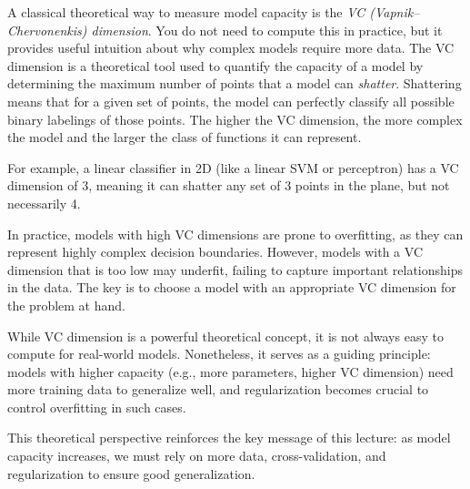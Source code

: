 \documentclass{article}
\begin{document}
A classical theoretical way to measure model capacity is the  \textit{VC (Vapnik–Chervonenkis) dimension}. You do not need to compute this in practice, but it provides useful intuition about why complex models require more data. The VC dimension is a theoretical tool used to quantify the capacity of a model by determining the maximum number of points that a model can \textit{shatter}. Shattering means that for a given set of points, the model can perfectly classify all possible binary labelings of those points. The higher the VC dimension, the more complex the model and the larger the class of functions it can represent.

For example, a linear classifier in 2D (like a linear SVM or perceptron) has a VC dimension of 3, meaning it can shatter any set of 3 points in the plane, but not necessarily 4.


In practice, models with high VC dimensions are prone to overfitting, as they can represent highly complex decision boundaries. However, models with a VC dimension that is too low may underfit, failing to capture important relationships in the data. The key is to choose a model with an appropriate VC dimension for the problem at hand.

While VC dimension is a powerful theoretical concept, it is not always easy to compute for real-world models. Nonetheless, it serves as a guiding principle: models with higher capacity (e.g., more parameters, higher VC dimension) need more training data to generalize well, and regularization becomes crucial to control overfitting in such cases.

This theoretical perspective reinforces the key message of this lecture: 
as model capacity increases, we must rely on more data, cross-validation, 
and regularization to ensure good generalization.


\end{document}

